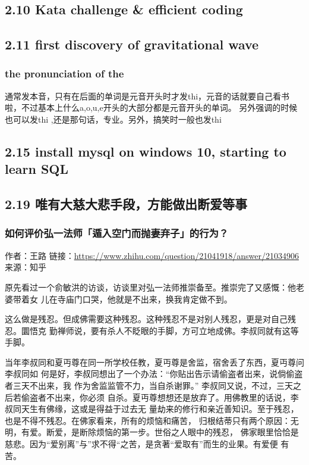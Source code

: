 \documentclass[11pt]{article}
\begin{document}
\subsection*{2.10 \textbf{Kata} challenge \& efficient coding}
\label{sec:orgheadline102}
\subsection*{2.11 first discovery of gravitational wave}
\label{sec:orgheadline104}
\subsubsection*{the pronunciation of \textbf{the}}
\label{sec:orgheadline103}
通常发本音，只有在后面的单词是元音开头时才发thi，元音的话就要自己看书啦，不过基本上什么a,o,u,e开头的大部分都是元音开头的单词。
另外强调的时候也可以发thi ,还是那句话，专业。另外，搞笑时一般也发thi
\subsection*{2.15 install mysql on windows 10, starting to learn SQL}
\label{sec:orgheadline105}
\subsection*{2.19 唯有大慈大悲手段，方能做出断爱等事}
\label{sec:orgheadline107}
\subsubsection*{如何评价弘一法师「遁入空门而抛妻弃子」的行为？}
\label{sec:orgheadline106}
作者：王路
链接：\url{https://www.zhihu.com/question/21041918/answer/21034906}
来源：知乎

原先看过一个俞敏洪的访谈，访谈里对弘一法师推崇备至。推崇完了又感慨：他老婆带着女
儿在寺庙门口哭，他就是不出来，换我肯定做不到。

这么做是残忍。但成佛需要这种残忍。这种残忍不是对别人残忍，更是对自己残忍。圜悟克
勤禅师说，要有杀人不眨眼的手脚，方可立地成佛。李叔同就有这等手脚。

当年李叔同和夏丏尊在同一所学校任教，夏丏尊是舍监，宿舍丢了东西，夏丏尊问李叔同如
何是好，李叔同想出了一个办法：“你贴出告示请偷盗者出来，说倘偷盗者三天不出来，我
作为舍监监管不力，当自杀谢罪。” 李叔同又说，不过，三天之后若偷盗者不出来，你必须
自杀。夏丏尊想想还是放弃了。用佛教里的话说，李叔同天生有佛缘，这或是得益于过去无
量劫来的修行和亲近善知识。至于残忍，也是不得不残忍。在佛家看来，所有的烦恼和痛苦，
归根结蒂只有两个原因：无明，有爱。断爱，是断除烦恼的第一步。世俗之人眼中的残忍，
佛家眼里恰恰是慈悲。因为“爱别离”与”求不得“之苦，是贪著“爱取有”而生的业果。有爱便
有苦。
\end{document}

